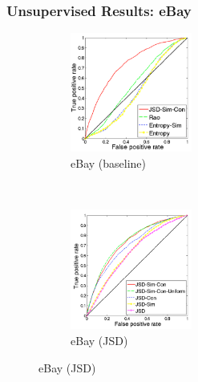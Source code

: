 \documentclass{beamer}
\begin{document}
\begin{frame}
\frametitle{Unsupervised Results: eBay}
\begin{figure}
        \centering
        \begin{subfigure}[b]{0.45\textwidth}
                \centering
                \includegraphics[width=40mm]{figures/phonecases-comparison-kopia.png}
               \caption{eBay (baseline)}
                \label{fig:phonecases-comparison}
        \end{subfigure}%
              ~ %
        \begin{subfigure}[b]{0.45\textwidth}
                \centering
                \includegraphics[width=40mm]{figures/phonecases-breakdown-kopia.png}
                \caption{eBay (JSD)}
                \label{fig:phonecases-breakdown}
        \end{subfigure}\nobreak
\end{figure}
\end{frame}
\end{document}
